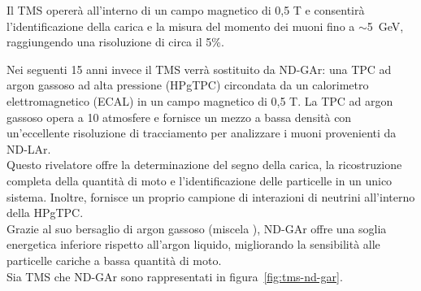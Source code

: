 \documentclass[../../main.tex]{subfiles}
\begin{document}
    Il TMS opererà all'interno di un campo magnetico di 0,5 T e consentirà
    l'identificazione della carica e la misura del momento dei muoni fino a
    $\sim$5~GeV, raggiungendo una risoluzione di circa il 5\%.


    Nei seguenti 15 anni invece il TMS verrà sostituito da ND-GAr: una TPC
    ad argon gassoso ad alta pressione (HPgTPC) circondata da un calorimetro
    elettromagnetico (ECAL) in un campo magnetico di 0,5 T\@.
    La TPC ad argon gassoso opera a 10 atmosfere e fornisce un mezzo a bassa
    densità con un'eccellente risoluzione di tracciamento per analizzare i muoni
    provenienti da ND-LAr.\\
    Questo rivelatore offre la determinazione del segno della carica, la
    ricostruzione completa della quantità di moto e l'identificazione delle
    particelle in un unico sistema.
    Inoltre, fornisce un proprio campione di interazioni di neutrini all'interno
    della HPgTPC\@.\\
    Grazie al suo bersaglio di argon gassoso (miscela ), ND-GAr
    offre una soglia energetica inferiore rispetto all'argon liquido,
    migliorando la sensibilità alle particelle cariche a bassa quantità di
    moto.\\
    Sia TMS che ND-GAr sono rappresentati in figura~\ref{fig:tms-nd-gar}.
\end{document}
